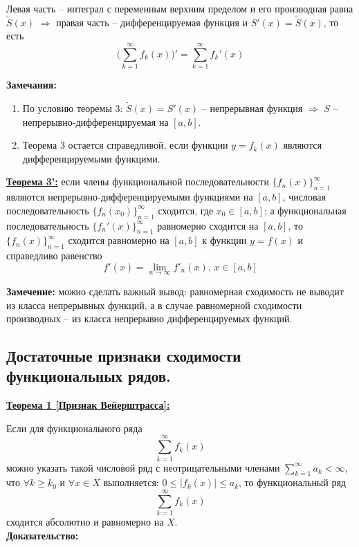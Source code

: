 \documentclass[a4paper,12pt]{article} %
\renewcommand {\geq}{\geqslant}
\renewcommand {\leq}{\leqslant}
\begin{document}
Левая часть -- интеграл с переменным верхним пределом и его производная равна $\widetilde{S}(x)$ $\Rightarrow$ правая часть -- дифференцируемая функция и $S'(x) = \widetilde{S}(x)$, то есть 
$$\bigg(\sum\limits_{k = 1}^{\infty}  f_k(x)\bigg)' = \sum\limits_{k = 1}^{\infty}  f_k'(x)$$

\noindent \textbf{Замечания:}
\begin{enumerate}
    \item По условию теоремы 3: $\widetilde{S}(x) = S'(x)$ -- непрерывная функция $\Rightarrow$ $S$ -- непрерывно-дифференцируемая на $[a,b]$.
    
    \item Теорема 3 остается справедливой, если функции $y=f_k(x)$ являются дифференцируемыми функцими.\\
\end{enumerate}

\underline{\textbf{Теорема 3':}} если члены функциональной последовательности $\{f_n(x)\}_{n=1}^\infty$ являются непрерывно-дифференцируемыми функциями на $[a,b]$, числовая последовательность $\{f_n(x_0)\}_{n=1}^\infty$ сходится, где $x_0 \in [a,b]$; а функциональная последовательность $\{f_n'(x)\}_{n=1}^\infty$ равномерно сходится на $[a,b]$, то $\{f_n(x)\}_{n=1}^\infty$ сходится равномерно на $[a,b]$ к функции $y = f(x)$ и справедливо равенство $$f'(x)= \lim\limits_{n\rightarrow \infty} f'_n(x) \text{, }x \in [a,b]$$

\textbf{Замечение:} можно сделать важный вывод: равномерная сходимость не выводит из класса непрерывных функций, а в случае равномерной сходимости производных -- из класса непрерывно дифференцируемых функций.

\subsection{Достаточные признаки сходимости функциональных рядов.}

\underline{\textbf{Теорема 1 [Признак Вейерштрасса]:}}

Если для функционального ряда $$\sum\limits_{k = 1}^{\infty}  f_k(x)$$ можно указать такой числовой ряд с неотрицательными членами $\sum\limits_{k = 1}^{\infty}a_k < \infty$, что $\forall k \geq k_0$ и $\forall x \in X$ выполняется: $0 \leq |f_k(x)| \leq a_k$, то функциональный ряд  $$\sum\limits_{k = 1}^{\infty}  f_k(x)$$ сходится абсолютно и равномерно на $X$.\\

\textbf{Доказательство:}
\end{document}
